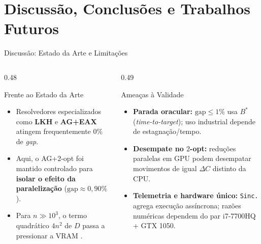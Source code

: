 
\section{Discussão, Conclusões e Trabalhos Futuros}

\begin{frame}{Discussão: Estado da Arte e Limitações}
  \begin{columns}[T,onlytextwidth]
    \begin{column}{0.48\textwidth}
      \begin{block}{Frente ao Estado da Arte}
        \begin{itemize}
          \item Resolvedores especializados como \textbf{LKH} \autocite{helsgaun2000effective} e \textbf{AG+EAX} \autocite{nagata2013powerful} atingem frequentemente $0\%$ de \emph{gap}.
          \item Aqui, o AG+$2$-opt foi mantido controlado para \textbf{isolar o efeito da paralelização} ($\text{gap} \approx 0{,}90\%$).
          \item Para $n \gg 10^3$, o termo quadrático $4n^2$ de $D$ passa a pressionar a VRAM \autocite{schulz2013gpu,oneil2015rethinking}.
        \end{itemize}
      \end{block}
    \end{column}
    \begin{column}{0.49\textwidth}
      \begin{alertblock}{Ameaças à Validade}
        \begin{itemize}
          \item \textbf{Parada oracular:} $\text{gap} \le 1\%$ usa $B^*$ (\emph{time-to-target}); uso industrial depende de estagnação/tempo.
          \item \textbf{Desempate no $2$-opt:} reduções paralelas em GPU podem desempatar movimentos de igual $\Delta C$ distinto da CPU.
          \item \textbf{Telemetria e hardware único:} \texttt{Sinc.} agrega execução assíncrona; razões numéricas dependem do par i7-7700HQ + GTX 1050.
        \end{itemize}
      \end{alertblock}
    \end{column}
  \end{columns}
\end{frame}

